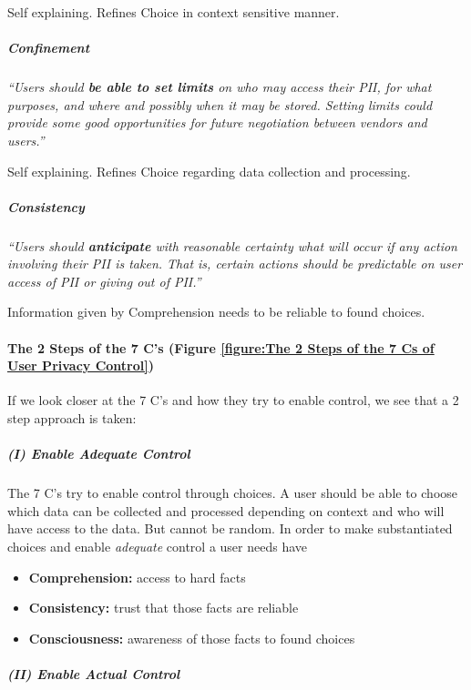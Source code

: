 Self explaining. Refines Choice in context sensitive manner.

\subparagraph{Confinement}

\emph{``Users should \textbf{be able to set limits} on who may access
their PII, for what purposes, and where and possibly when it may be
stored. Setting limits could provide some good opportunities for future
negotiation between vendors and users.''}

Self explaining. Refines Choice regarding data collection and
processing.

\subparagraph{Consistency}

\emph{``Users should \textbf{anticipate} with reasonable certainty what
will occur if any action involving their PII is taken. That is, certain
actions should be predictable on user access of PII or giving out of
PII.''}

Information given by Comprehension needs to be reliable to found
choices.

\paragraph{The 2 Steps of the 7 C's (Figure \ref{figure:The 2 Steps of the 7 Cs of User Privacy Control})}

If we look closer at the 7 C's and how they try to enable control, we
see that a 2 step approach is taken:



\subparagraph{(I) Enable \emph{Adequate} Control}

The 7 C's try to enable control through choices. A user should be able
to choose which data can be collected and processed depending on context
and who will have access to the data. But cannot be random. In order to
make substantiated choices and enable \emph{adequate} control a user
needs have

\begin{itemize}

\item
  \textbf{Comprehension:} access to hard facts
\item
  \textbf{Consistency:} trust that those facts are reliable
\item
  \textbf{Consciousness:} awareness of those facts to found choices
\end{itemize}

\subparagraph{(II) Enable \emph{Actual} Control}

